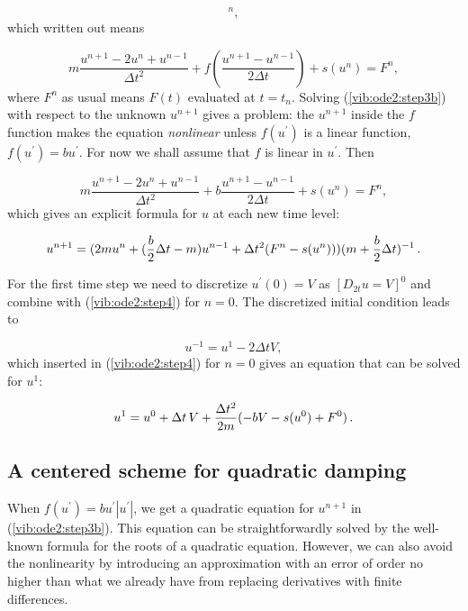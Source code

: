 \documentclass[%
oneside,                 %
final,                   %
10pt]{article}
\begin{document}
\begin{equation}
[mD_tD_t u + f(D_{2t}u) + s(u) = F]^n,
\end{equation}
which written out means

\begin{equation}
m\frac{u^{n+1}-2u^n + u^{n-1}}{\Delta t^2}
+ f(\frac{u^{n+1}-u^{n-1}}{2\Delta t}) + s(u^n) = F^n,
\label{vib:ode2:step3b}
\end{equation}
where $F^n$ as usual means $F(t)$ evaluated at $t=t_n$.
Solving (\ref{vib:ode2:step3b}) with respect to the unknown
$u^{n+1}$ gives a problem: the $u^{n+1}$ inside the $f$ function
makes the equation \emph{nonlinear} unless $f(u^{\prime})$ is a linear function,
$f(u^{\prime})=bu^{\prime}$. For now we shall assume that $f$ is linear in $u^{\prime}$.
Then

\begin{equation}
m\frac{u^{n+1}-2u^n + u^{n-1}}{\Delta t^2}
+ b\frac{u^{n+1}-u^{n-1}}{2\Delta t} + s(u^n) = F^n,
\label{vib:ode2:step3b2}
\end{equation}
which gives an explicit formula for $u$ at each
new time level:

\begin{equation}
u^{n+1} = (2mu^n + (\frac{b}{2}\Delta t - m)u^{n-1} +
\Delta t^2(F^n - s(u^n)))(m + \frac{b}{2}\Delta t)^{-1}
\label{vib:ode2:step4}
\tp
\end{equation}

For the first time step we need to discretize $u^{\prime}(0)=V$
as $[D_{2t}u = V]^0$ and combine
with (\ref{vib:ode2:step4}) for $n=0$. The discretized initial condition
leads to

\begin{equation}
u^{-1} = u^{1} - 2\Delta t V,
\label{vib:ode2:ic:du}
\end{equation}
which inserted in (\ref{vib:ode2:step4}) for $n=0$ gives an equation
that can be solved for
$u^1$:

\begin{equation}
u^1 = u^0 + \Delta t\, V
+ \frac{\Delta t^2}{2m}(-bV - s(u^0) + F^0)
\tp
\label{vib:ode2:step4b}
\end{equation}

\subsection{A centered scheme for quadratic damping}
\label{vib:ode2:fdm:fquad}

When $f(u^{\prime})=bu^{\prime}|u^{\prime}|$, we get a quadratic equation for $u^{n+1}$
in (\ref{vib:ode2:step3b}). This equation can be straightforwardly
solved by the well-known formula for the roots of a quadratic equation.
However, we can also avoid the nonlinearity by introducing
an approximation with an error of order no higher than what we
already have from replacing derivatives with finite differences.
\end{document}
